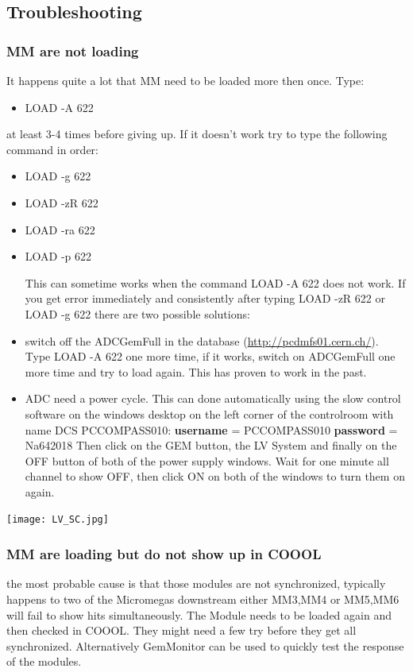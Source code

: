 \documentclass[a4paper]{article}
\begin{document}
\subsection{Troubleshooting}
\label{sec:org8db427d}
\subsubsection{MM are not loading}
\label{sec:org94c1fd3}
It happens quite a lot that MM need to be loaded more then once. Type:

\begin{itemize}
\item LOAD -A 622
\end{itemize}

at least 3-4 times before giving up. If it doesn't work try to type the following
command in order:

\begin{itemize}
\item LOAD -g 622
\item LOAD -zR 622
\item LOAD -ra 622
\item LOAD -p 622

This can sometime works when the command LOAD -A 622 does not work. If you get error immediately and consistently after typing
LOAD -zR 622 or LOAD -g 622 there are two possible solutions:
\item switch off the ADCGemFull in the database (\url{http://pcdmfs01.cern.ch/}). Type LOAD -A 622 one more time, if it works, switch on ADCGemFull one more time and try to load again. This has proven to work in the past.
\item ADC need a power cycle. This can done automatically using the slow control software on the windows desktop on the left corner of the controlroom with name DCS PCCOMPASS010:
\textbf{username} = PCCOMPASS010
\textbf{password} = Na642018
Then click on the GEM button, the LV System and finally on the OFF button of both of the power supply windows. Wait for one minute all channel to show OFF, then click ON on both of the windows to turn
them on again.
\end{itemize}
\begin{center}
\texttt{[image: LV\_SC.jpg]}
\end{center}

\subsubsection{MM are loading but do not show up in COOOL}
\label{sec:org88f6e60}
the most probable cause is that those modules are not synchronized, typically happens to two of the Micromegas downstream either MM3,MM4 or MM5,MM6 will fail to show hits simultaneously.
The Module needs to be loaded again and then checked in COOOL. They might need a few try before they get all synchronized. Alternatively GemMonitor can be used to quickly test the response of the modules.
\end{document}
